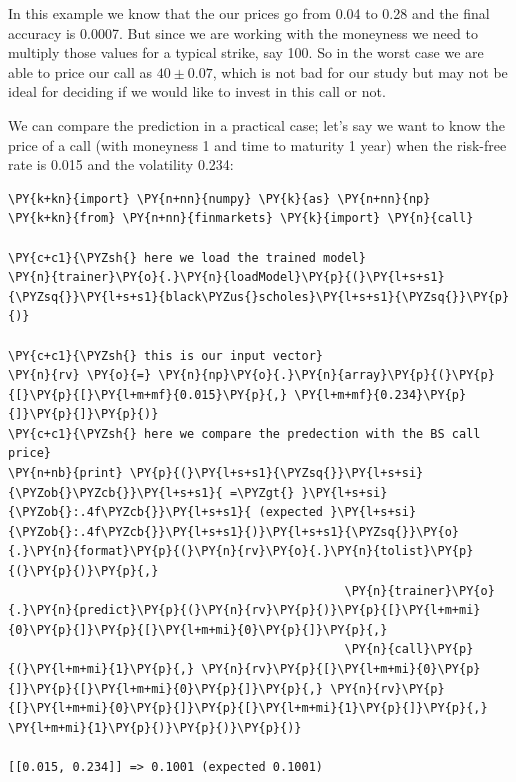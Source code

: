 In this example we know that the our prices go from 0.04 to 0.28 and the
final accuracy is 0.0007. But since we are working with the moneyness we
need to multiply those values for a typical strike, say 100. So in the
worst case we are able to price our call as \(40 \pm 0.07\), which
is not bad for our study but may not be ideal for deciding if we would
like to invest in this call or not.

We can compare the prediction in a practical case; let's say we
want to know the price of a call (with moneyness 1 and time to maturity
1 year) when the risk-free rate is 0.015 and the volatility 0.234:

\begin{tcolorbox}[breakable, size=fbox, boxrule=1pt, pad at break*=1mm,colback=cellbackground, colframe=cellborder]
\begin{Verbatim}[commandchars=\\\{\}]
\PY{k+kn}{import} \PY{n+nn}{numpy} \PY{k}{as} \PY{n+nn}{np}
\PY{k+kn}{from} \PY{n+nn}{finmarkets} \PY{k}{import} \PY{n}{call}
	
\PY{c+c1}{\PYZsh{} here we load the trained model}
\PY{n}{trainer}\PY{o}{.}\PY{n}{loadModel}\PY{p}{(}\PY{l+s+s1}{\PYZsq{}}\PY{l+s+s1}{black\PYZus{}scholes}\PY{l+s+s1}{\PYZsq{}}\PY{p}{)}
	
\PY{c+c1}{\PYZsh{} this is our input vector}
\PY{n}{rv} \PY{o}{=} \PY{n}{np}\PY{o}{.}\PY{n}{array}\PY{p}{(}\PY{p}{[}\PY{p}{[}\PY{l+m+mf}{0.015}\PY{p}{,} \PY{l+m+mf}{0.234}\PY{p}{]}\PY{p}{]}\PY{p}{)}
\PY{c+c1}{\PYZsh{} here we compare the predection with the BS call price}
\PY{n+nb}{print} \PY{p}{(}\PY{l+s+s1}{\PYZsq{}}\PY{l+s+si}{\PYZob{}\PYZcb{}}\PY{l+s+s1}{ =\PYZgt{} }\PY{l+s+si}{\PYZob{}:.4f\PYZcb{}}\PY{l+s+s1}{ (expected }\PY{l+s+si}{\PYZob{}:.4f\PYZcb{}}\PY{l+s+s1}{)}\PY{l+s+s1}{\PYZsq{}}\PY{o}{.}\PY{n}{format}\PY{p}{(}\PY{n}{rv}\PY{o}{.}\PY{n}{tolist}\PY{p}{(}\PY{p}{)}\PY{p}{,} 
                                               \PY{n}{trainer}\PY{o}{.}\PY{n}{predict}\PY{p}{(}\PY{n}{rv}\PY{p}{)}\PY{p}{[}\PY{l+m+mi}{0}\PY{p}{]}\PY{p}{[}\PY{l+m+mi}{0}\PY{p}{]}\PY{p}{,} 
                                               \PY{n}{call}\PY{p}{(}\PY{l+m+mi}{1}\PY{p}{,} \PY{n}{rv}\PY{p}{[}\PY{l+m+mi}{0}\PY{p}{]}\PY{p}{[}\PY{l+m+mi}{0}\PY{p}{]}\PY{p}{,} \PY{n}{rv}\PY{p}{[}\PY{l+m+mi}{0}\PY{p}{]}\PY{p}{[}\PY{l+m+mi}{1}\PY{p}{]}\PY{p}{,} \PY{l+m+mi}{1}\PY{p}{)}\PY{p}{)}\PY{p}{)}

[[0.015, 0.234]] => 0.1001 (expected 0.1001)
\end{Verbatim}
\end{tcolorbox}

